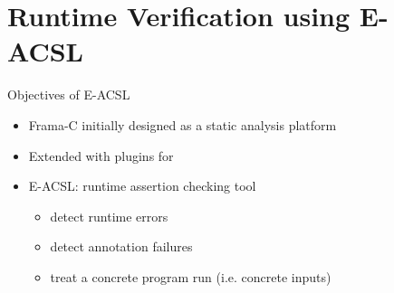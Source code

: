 \newcommand{\bs}{\ensuremath{\backslash}}

\section{Runtime Verification using E-ACSL}


\begin{frame}{Objectives of E-ACSL}

  \begin{itemize}
  \item Frama-C initially designed as a static analysis platform
  \item Extended with plugins for 
  \item E-ACSL: runtime assertion checking tool
    \begin{itemize}
  	\item detect runtime errors 
  	\item detect annotation failures
  	\item treat a concrete program run (i.e. concrete inputs)
  \end{itemize}  
  \end{itemize}
  
\end{frame}


